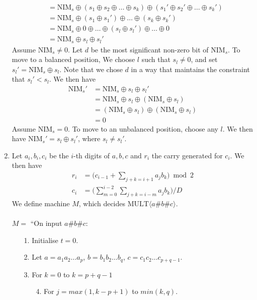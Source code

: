 \documentclass[11pt]{article}
\begin{document}
\begin{enumerate}[8.1]
\begin{align*}
                  &= \text{NIM}_s \oplus (s_1 \oplus s_2 \oplus \hdots \oplus s_k ) \oplus (s_1' \oplus s_2' \oplus \hdots \oplus s_k' ) \\
                  &= \text{NIM}_s \oplus (s_1 \oplus s_1') \oplus \hdots \oplus (s_k \oplus s_k') \\
                  &= \text{NIM}_s \oplus 0 \oplus \hdots \oplus (s_l \oplus s_l') \oplus \hdots \oplus 0 \\
                  &= \text{NIM}_s \oplus s_l \oplus s_l'
  \end{align*}
  Assume $\text{NIM}_s \neq 0$. Let $d$ be the most significant non-zero bit of $\text{NIM}_s$. To move to a balanced position, We choose $l$ such that $s_l \neq 0$, and set $s_l' = \text{NIM}_s \oplus s_l$. Note that we chose $d$ in a way that maintains the constraint that $s_l' < s_l$. We then have
  \begin{align*}
    \text{NIM}_s'&= \text{NIM}_s \oplus s_l \oplus s_l' \\
                 &= \text{NIM}_s \oplus s_l \oplus (\text{NIM}_s \oplus s_l) \\
                 &= (\text{NIM}_s \oplus s_l) \oplus (\text{NIM}_s \oplus s_l) \\
                 &= 0
  \end{align*}
  Assume $\text{NIM}_s = 0$. To move to an unbalanced position, choose any $l$. We then have $\text{NIM}_s' = s_l \oplus s_l'$, where $s_l \neq s_l'$.
\item Let $a_i, b_i, c_i$ be the $i$-th digits of $a,b,c$ and $r_i$ the carry generated for $c_i$. We then have
  \begin{align*}
    r_i &= \Big(c_{i-1} + \sum_{j+k=i+1} a_jb_k \Big) \bmod 2 \\
    c_i &= \Big(\sum_{m=0}^{i-2} \sum_{j+k=i-m} a_jb_k \Big) / D
  \end{align*}
  We define machine $M$, which decides $\text{MULT}\langle a\#b\#c \rangle$. \\\\
  $M =$ ``On input $a\#b\#c$:
  \begin{enumerate}
    \item[1.] Initialise $t = 0$.
    \item[2.] Let $a = a_1a_2 \hdots a_p$, $b = b_1b_2 \hdots b_q$, $c = c_1c_2 \hdots c_{p+q-1}$.
    \item[3.] For $k = 0$ to $k = p + q - 1$
    \begin{enumerate}
      \item[4.] For $j = max(1, k - p + 1)$ to $min(k, q)$.

\end{enumerate}
\end{enumerate}
\end{enumerate}
\end{document}
